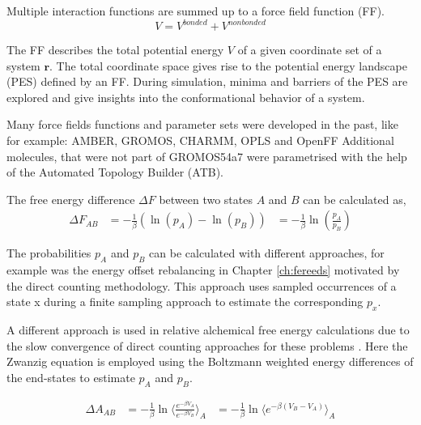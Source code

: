 Multiple interaction functions are summed up to a force field function (FF). 
\begin{equation}
    V = V^{bonded} + V^{nonbonded} 
\end{equation}

The FF describes the total potential energy $V$ of a given coordinate set of a system $\textbf{r}$. The total coordinate space gives rise to the potential energy landscape (PES) defined by an FF.
During simulation, minima and barriers of the PES are explored and give insights into the conformational behavior of a system.

Many force fields functions and parameter sets were developed in the past, like for example: AMBER\cite{weiner1981,pearlman1995, cornell1995, LindorffLarsen2010}, GROMOS\cite{Daura1998, Oostenbrink2004, Schuler2001,Schmid2011, Malde2011, Stroet2018}, CHARMM\cite{brooks1983, mackerell1995,mackerell1998}, OPLS \cite{jorgensen1988, jorgensen1996} and OpenFF \cite{Qiu2021}
Additional molecules, that were not part of GROMOS54a7 were parametrised with the help of the Automated Topology Builder (ATB). \cite{Malde2011, Stroet2018}



The free energy difference $\Delta F$ between two states $A$ and $B$  can be calculated as,
\begin{equation}
    \begin{split}
        \Delta F_{AB} &= -\frac{1}{\beta} (\ln(p_A) - \ln(p_B)) 
                      &= -\frac{1}{\beta} \ln(\frac{p_A}{p_B})
    \end{split}
\end{equation}


The probabilities $p_A$ and $p_B$ can be calculated with different approaches, for example was the energy offset rebalancing in Chapter \ref{ch:fereeds} motivated by the direct counting methodology\cite{}. This approach uses sampled occurrences of a state x during a finite sampling approach to estimate the corresponding $p_x$. 

A different approach is used in relative alchemical free energy calculations due to the slow convergence of direct counting approaches for these problems \cite{}.
Here the Zwanzig equation \cite{Zwanzig1954} is employed using the Boltzmann weighted energy differences of the end-states to estimate $p_A$ and $p_B$.

\begin{equation}
    \begin{split}
        \Delta A_{AB} &= -\frac{1}{\beta} \ln \langle \frac{e^{- \beta V_A}}{e^{- \beta V_B}} \rangle_A
                      &= -\frac{1}{\beta} \ln \langle e^{- \beta (V_B-V_A)} \rangle_A
    \end{split}
\end{equation}

